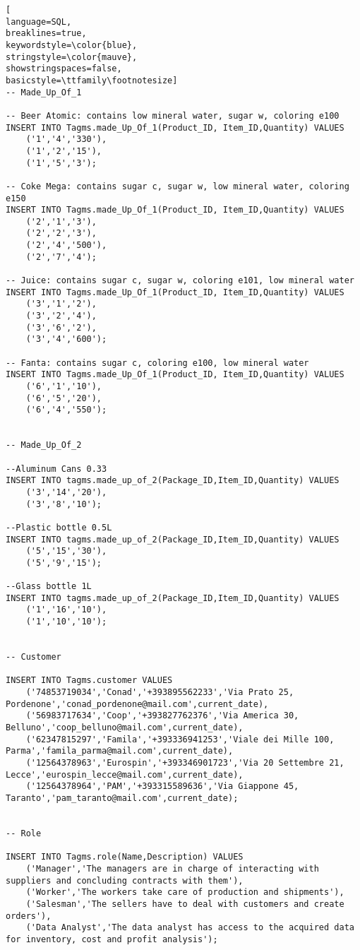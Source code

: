 \begin{lstlisting}[
language=SQL,
breaklines=true,
keywordstyle=\color{blue},
stringstyle=\color{mauve},
showstringspaces=false,
basicstyle=\ttfamily\footnotesize]
-- Made_Up_Of_1

-- Beer Atomic: contains low mineral water, sugar w, coloring e100
INSERT INTO Tagms.made_Up_Of_1(Product_ID, Item_ID,Quantity) VALUES
    ('1','4','330'),
    ('1','2','15'),
    ('1','5','3');

-- Coke Mega: contains sugar c, sugar w, low mineral water, coloring e150
INSERT INTO Tagms.made_Up_Of_1(Product_ID, Item_ID,Quantity) VALUES
    ('2','1','3'),
    ('2','2','3'),
    ('2','4','500'),
    ('2','7','4');

-- Juice: contains sugar c, sugar w, coloring e101, low mineral water
INSERT INTO Tagms.made_Up_Of_1(Product_ID, Item_ID,Quantity) VALUES
    ('3','1','2'),
    ('3','2','4'),
    ('3','6','2'),
    ('3','4','600');

-- Fanta: contains sugar c, coloring e100, low mineral water
INSERT INTO Tagms.made_Up_Of_1(Product_ID, Item_ID,Quantity) VALUES
    ('6','1','10'),
    ('6','5','20'),
    ('6','4','550');


-- Made_Up_Of_2

--Aluminum Cans 0.33
INSERT INTO tagms.made_up_of_2(Package_ID,Item_ID,Quantity) VALUES
    ('3','14','20'),
    ('3','8','10');

--Plastic bottle 0.5L
INSERT INTO tagms.made_up_of_2(Package_ID,Item_ID,Quantity) VALUES
    ('5','15','30'),
    ('5','9','15');

--Glass bottle 1L
INSERT INTO tagms.made_up_of_2(Package_ID,Item_ID,Quantity) VALUES
    ('1','16','10'),
    ('1','10','10');


-- Customer

INSERT INTO Tagms.customer VALUES
    ('74853719034','Conad','+393895562233','Via Prato 25, Pordenone','conad_pordenone@mail.com',current_date),
    ('56983717634','Coop','+393827762376','Via America 30, Belluno','coop_belluno@mail.com',current_date),
    ('62347815297','Famila','+393336941253','Viale dei Mille 100, Parma','famila_parma@mail.com',current_date),
    ('12564378963','Eurospin','+393346901723','Via 20 Settembre 21, Lecce','eurospin_lecce@mail.com',current_date),
    ('12564378964','PAM','+393315589636','Via Giappone 45, Taranto','pam_taranto@mail.com',current_date);


-- Role

INSERT INTO Tagms.role(Name,Description) VALUES
    ('Manager','The managers are in charge of interacting with suppliers and concluding contracts with them'),
    ('Worker','The workers take care of production and shipments'),
    ('Salesman','The sellers have to deal with customers and create orders'),
    ('Data Analyst','The data analyst has access to the acquired data for inventory, cost and profit analysis');



\end{lstlisting}
